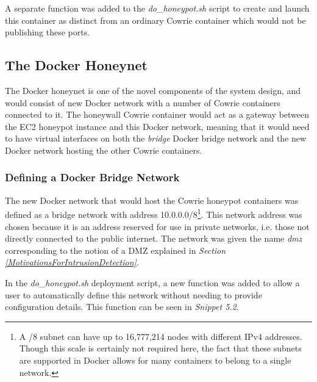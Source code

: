 
A separate function was added to the \textit{do\_honeypot.sh} script to create and launch this container as distinct from an ordinary Cowrie container which would not be publishing these ports. 





%
%
\subsection{The Docker Honeynet}
The Docker honeynet is one of the novel components of the system design, and would consist of new Docker network with a number of Cowrie containers connected to it. The honeywall Cowrie container would act as a gateway between the EC2 honeypot instance and this Docker network, meaning that it would need to have virtual interfaces on both the \textit{bridge} Docker bridge network and the new Docker network hosting the other Cowrie containers.

\subsubsection{Defining a Docker Bridge Network}
    The new Docker network that would host the Cowrie honeypot containers was defined as a bridge network with address 10.0.0.0/8\footnote{A /8 subnet can have up to 16,777,214 nodes with different IPv4 addresses. Though this scale is certainly not required here, the fact that these subnets are supported in Docker allows for many containers to belong to a single network.}. This network address was chosen because it is an address reserved for use in private networks, i.e. those not directly connected to the public internet. \cite{rfc1918}  The network was given the name \textit{dmz} corresponding to the notion of a DMZ explained in \textit{Section \ref{MotivationsForIntrusionDetection}}.
    
    In the \textit{do\_honeypot.sh} deployment script, a new function was added to allow a user to automatically define this network without needing to provide configuration details. This function can be seen in \textit{Snippet 5.2}.
    \mbox{}\\
    \label{create-dmz-net-code}

